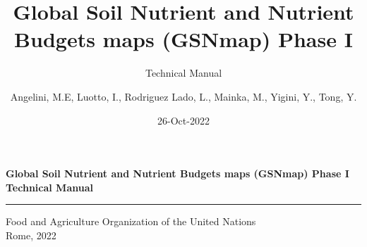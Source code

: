\documentclass[
  10pt,
  b5paper,
  oneside]{book}
\title{
Global Soil Nutrient and Nutrient Budgets maps (GSNmap) Phase I}
\subtitle{Technical Manual}
\author{Angelini, M.E, Luotto, I., Rodriguez Lado, L., Mainka, M., Yigini, Y., Tong, Y.}
\date{26-Oct-2022}
\newcommand\blankpage{%
    \null
    \thispagestyle{empty}%
    \addtocounter{page}{-1}%
    \newpage}
\begin{document}
\maketitle

\pagestyle{plain}

\afterpage{\blankpage}
\thispagestyle{empty}
\begin{titlepage}
    \begin{center}
        \vspace*{4cm}
        \Large

        \textcolor{astral}{\textbf{Global Soil Nutrient and Nutrient Budgets maps (GSNmap) Phase I\\
Technical Manual\\}}
        \vspace{0.5cm}
        \normalsize
        \vfill
        \noindent
        {\color{astral}\rule{\linewidth}{0.5mm} }

        Food and Agriculture Organization of the United Nations\\
	Rome, 2022
    \end{center}
\end{titlepage}



\frontmatter
{}   
\tableofcontents
\listoffigures
\listoftables
\nopagebreak[5]
\end{document}
